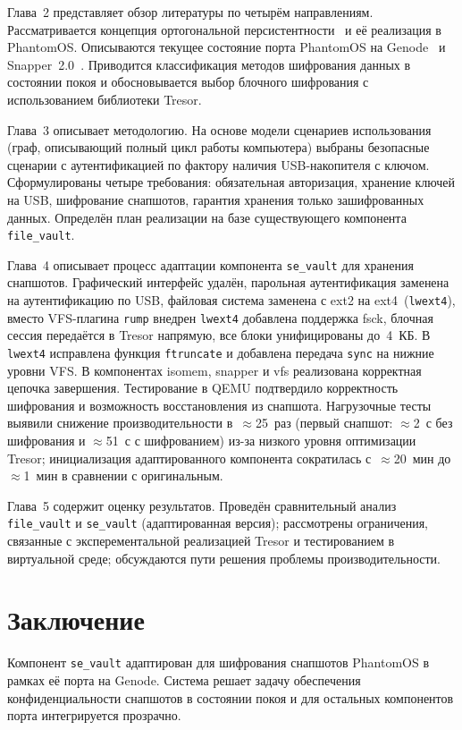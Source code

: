 \documentclass[oneside,final,14pt,a4paper]{extreport}
\theoremstyle{definition}
\theoremstyle{remark}
\theoremstyle{remark}
\begin{document}
Глава~2 представляет обзор литературы по четырём направлениям. Рассматривается концепция ортогональной персистентности~\cite{PLA} и её реализация в PhantomOS. Описываются текущее состояние порта PhantomOS на Genode~\cite{Antonov_Anton} и Snapper~2.0~\cite{FOSDEM_Snapper_paper}. Приводится классификация методов шифрования данных в состоянии покоя и обосновывается выбор блочного шифрования с использованием библиотеки Tresor.

Глава~3 описывает методологию. На основе модели сценариев использования (граф, описывающий полный цикл работы компьютера) выбраны безопасные сценарии с аутентификацией по фактору наличия USB-накопителя с ключом. Сформулированы четыре требования: обязательная авторизация, хранение ключей на USB, шифрование снапшотов, гарантия хранения только зашифрованных данных. Определён план реализации на базе существующего компонента \texttt{file\_vault}.

Глава~4 описывает процесс адаптации компонента \texttt{se\_vault} для хранения снапшотов. Графический интерфейс удалён, парольная аутентификация заменена на аутентификацию по USB, файловая система заменена с ext2 на ext4~(\texttt{lwext4}), вместо VFS-плагина \texttt{rump} внедрен \texttt{lwext4} добавлена поддержка fsck, блочная сессия передаётся в Tresor напрямую, все блоки унифицированы до~4~КБ. В \texttt{lwext4} исправлена функция \texttt{ftruncate} и добавлена передача \texttt{sync} на нижние уровни VFS. В компонентах isomem, snapper и vfs реализована корректная цепочка завершения. Тестирование в QEMU подтвердило корректность шифрования и возможность восстановления из снапшота. Нагрузочные тесты выявили снижение производительности в~$\approx$25~раз (первый снапшот: $\approx$2~с без шифрования и $\approx$51~с с шифрованием) из-за низкого уровня оптимизации Tresor; инициализация адаптированного компонента сократилась с~$\approx$20~мин до~$\approx$1~мин в сравнении с оригинальным.

Глава~5 содержит оценку результатов. Проведён сравнительный анализ \texttt{file\_vault} и \texttt{se\_vault} (адаптированная версия); рассмотрены ограничения, связанные с эксперементальной реализацией Tresor и тестированием в виртуальной среде; обсуждаются пути решения проблемы производительности.

\section{Заключение}

Компонент \texttt{se\_vault} адаптирован для шифрования снапшотов PhantomOS в рамках её порта на Genode. Система решает задачу обеспечения конфиденциальности снапшотов в состоянии покоя и для остальных компонентов порта интегрируется прозрачно.
\end{document}
